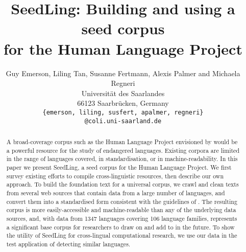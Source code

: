 \documentclass[11pt]{article}
\title{SeedLing: Building and using a seed corpus \\ for the Human Language Project}
\author{Guy Emerson, Liling Tan, Susanne Fertmann, Alexis Palmer and Michaela Regneri \\
Universität des Saarlandes \\
66123 Saarbrücken, Germany \\
{\tt \{emerson, liling, susfert, apalmer, regneri\}} \\
{\tt @coli.uni-saarland.de} \\
}
\date{}
\newcommand{\bluenote}[1]{\textcolor{blue}{[#1]}}
\begin{document}
\maketitle
\begin{abstract}
  A broad-coverage corpus such as the Human Language Project
  envisioned by  would be a powerful
  resource for the study of endangered languages.
  Existing corpora are limited in the range of languages covered, in
  standardisation, or in machine-readability. In this paper we present
  SeedLing, a seed corpus for the Human Language Project. We first
  survey existing efforts to compile cross-linguistic resources, then
  describe our own approach. To build the foundation text for a
  universal corpus, we crawl and clean texts from several web sources
  that contain data from a large number of languages, and convert them
  into a standardised form consistent with the guidelines of
  . The resulting corpus is more
  easily-accessible and machine-readable than any of the underlying
  data sources, and, with data from 1347 languages covering 106
  language families, represents a significant base corpus for
  researchers to draw on and add to in the future. To show the utility
  of SeedLing for cross-lingual computational research, we use our
  data in the test application of detecting similar languages.
\end{abstract}




%



%



\end{document}
